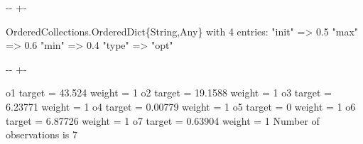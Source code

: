 \documentclass[a4paper,10pt,english]{sphinxmanual}
\newlength\nbsphinxcodecellspacing
\begin{document}
{

\kern-\sphinxverbatimsmallskipamount\kern-\baselineskip
\kern+\FrameHeightAdjust\kern-\fboxrule
\vspace{\nbsphinxcodecellspacing}

\begin{sphinxVerbatim}[commandchars=\\\{\}]
\llap{\color{nbsphinxout}[7]:\,\hspace{\fboxrule}\hspace{\fboxsep}}OrderedCollections.OrderedDict\{String,Any\} with 4 entries:
  "init" => 0.5
  "max"  => 0.6
  "min"  => 0.4
  "type" => "opt"
\end{sphinxVerbatim}
}

{
\begin{sphinxVerbatim}[commandchars=\\\{\}]
\llap{\color{nbsphinxin}[8]:\,\hspace{\fboxrule}\hspace{\fboxsep}}
\end{sphinxVerbatim}
}

{

\kern-\sphinxverbatimsmallskipamount\kern-\baselineskip
\kern+\FrameHeightAdjust\kern-\fboxrule
\vspace{\nbsphinxcodecellspacing}

\begin{sphinxVerbatim}[commandchars=\\\{\}]
o1         target =          43.524 weight =               1
o2         target =         19.1588 weight =               1
o3         target =         6.23771 weight =               1
o4         target =         0.00779 weight =               1
o5         target =               0 weight =               1
o6         target =         6.87726 weight =               1
o7         target =         0.63904 weight =               1
Number of observations is 7
\end{sphinxVerbatim}
}
\end{document}
